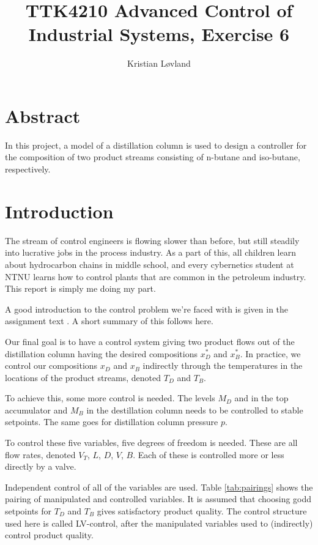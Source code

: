 \documentclass[12pt]{article}
\title{TTK4210 Advanced Control of Industrial Systems, Exercise 6}
\date{}
\author{Kristian Løvland}
\begin{document}
\maketitle
\tableofcontents

\newpage
\section{Abstract}
In this project, a model of a distillation column is used to design a controller for the composition of two product streams consisting of n-butane and iso-butane, respectively. 

\newpage
\section{Introduction}
The stream of control engineers is flowing slower than before, but still steadily into lucrative jobs in the process industry. As a part of this, all children learn about hydrocarbon chains in middle school, and every cybernetics student at NTNU learns how to control plants that are common in the petroleum industry. This report is simply me doing my part.

A good introduction to the control problem we're faced with is given in the assignment text . A short summary of this follows here.

Our final goal is to have a control system giving two product flows out of the distillation column having the desired compositions $x_D^*$ and $x_B^*$. In practice, we control our compositions $x_D$ and $x_B$ indirectly through the temperatures in the locations of the product streams, denoted $T_D$ and $T_B$.

To achieve this, some more control is needed. The levels $M_D$ and in the top accumulator and $M_B$ in the destillation column needs to be controlled to stable setpoints. The same goes for distillation column pressure $p$.

To control these five variables, five degrees of freedom is needed. These are all flow rates, denoted $V_T$, $L$, $D$, $V$, $B$. Each of these is controlled more or less directly by a valve.

Independent control of all of the variables are used. Table \ref{tab:pairings} shows the pairing of manipulated and controlled variables. It is assumed that choosing godd setpoints for $T_D$ and $T_B$ gives satisfactory product quality. The control structure used here is called LV-control, after the manipulated variables used to (indirectly) control product quality.
\end{document}
